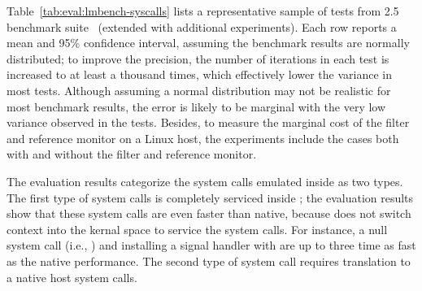 \begin{table}[t!b!]

\caption{System call benchmark results based on \lmbench{} 2.5. Comparison is among (1) native Linux processes, (2) \graphene{} \picoprocs{} on Linux host, both without and with JIT-optimized SECCOMP filter ({\bf +SC}) and reference monitor ({\bf +RM}), and (3) \graphene{} in \sgx{} enclaves.
System call latency is in microseconds, and lower is better.
System call bandwidth and throughput are in megabytes per second and operations per second, respectively, and higher is better. 
Overheads are relative to Linux \linuxversion{}; negative overheads indicate improved performance.} 
\label{tab:eval:lmbench-streams}
\end{table}


Table~\ref{tab:eval:lmbench-syscalls} lists 
a representative sample of 
tests from \lmbench{} 2.5 benchmark suite~\cite{McVoy:lmbench}
(extended with additional experiments).
Each row reports a mean and 95\% confidence interval,
assuming the benchmark results are normally distributed;
to improve the precision,
the number of iterations in each test is increased to at least a thousand times, which effectively lower the variance
in most tests.
Although assuming a normal distribution may not be realistic for most benchmark results,
the error is likely to be marginal with the very low variance
observed in the tests.
Besides, to measure the marginal cost of the \seccomp{} filter and reference monitor on a Linux host,
the experiments include the cases both with
and without the \seccomp{} filter and reference monitor.


The evaluation results categorize
the system calls emulated inside \thelibos{}
as two types.
The first type of system calls is completely serviced inside \thelibos{};
the evaluation results show that these system calls are even faster than native, because \thelibos{} does not switch context into the kernal space
to service the system calls.
For instance,
a null system call (i.e., ) and installing a signal handler with 
are up to three time as fast as the native performance.
The second type of system call requires translation to a native host system calls.
